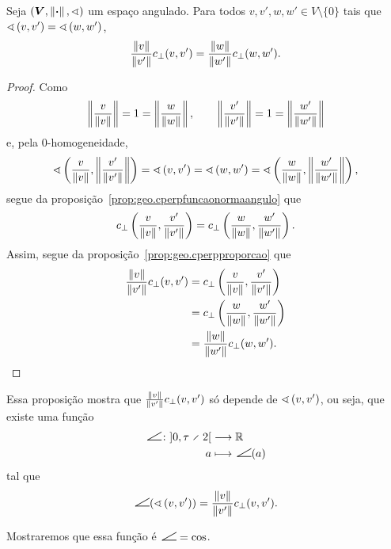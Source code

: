 \begin{proposition}
\label{prop:geo.cperpfuncaoangulo}
Seja $(\bm V, \left\Vert{\bm{\cdot}}\right\Vert,\sphericalangle)$ um espaço angulado. Para todos $v,v',w,w' \in V \setminus \{0\}$ tais que $\sphericalangle\left({v},{v'}\right)=\sphericalangle\left({w},{w'}\right)$,
	\begin{equation*}
	\frac{\left\Vert{v}\right\Vert}{\left\Vert{v'}\right\Vert}c_{\perp}(v,v') = \frac{\left\Vert{w}\right\Vert}{\left\Vert{w'}\right\Vert}c_{\perp}(w,w').
	\end{equation*}
\end{proposition}
\begin{proof}
Como
	\begin{equation*}
	\left\Vert{\frac{v}{\left\Vert{v}\right\Vert}}\right\Vert = 1 = \left\Vert{\frac{w}{\left\Vert{w}\right\Vert}}\right\Vert, \qquad \left\Vert{\frac{v'}{\left\Vert{v'}\right\Vert}}\right\Vert = 1 = \left\Vert{\frac{w'}{\left\Vert{w'}\right\Vert}}\right\Vert
	\end{equation*}
e, pela $0$-homogeneidade,
	\begin{equation*}
	\sphericalangle\left({\frac{v}{\left\Vert{v}\right\Vert}},{\left\Vert{\frac{v'}{\left\Vert{v'}\right\Vert}}\right\Vert}\right) = \sphericalangle\left({v},{v'}\right) = \sphericalangle\left({w},{w'}\right) = \sphericalangle\left({\frac{w}{\left\Vert{w}\right\Vert}},{\left\Vert{\frac{w'}{\left\Vert{w'}\right\Vert}}\right\Vert}\right),
	\end{equation*}
segue da proposição~\ref{prop:geo.cperpfuncaonormaangulo} que
	\begin{equation*}
	c_{\perp}\left( \frac{v}{\left\Vert{v}\right\Vert},\frac{v'}{\left\Vert{v'}\right\Vert} \right) = c_{\perp}\left( \frac{w}{\left\Vert{w}\right\Vert},\frac{w'}{\left\Vert{w'}\right\Vert} \right).
	\end{equation*}
Assim, segue da proposição~\ref{prop:geo.cperpproporcao} que
	\begin{align*}
	\frac{\left\Vert{v}\right\Vert}{\left\Vert{v'}\right\Vert}c_{\perp}(v,v') &= c_{\perp}\left( \frac{v}{\left\Vert{v}\right\Vert},\frac{v'}{\left\Vert{v'}\right\Vert} \right) \\
		&= c_{\perp}\left( \frac{w}{\left\Vert{w}\right\Vert},\frac{w'}{\left\Vert{w'}\right\Vert} \right) \\
		&= \frac{\left\Vert{w}\right\Vert}{\left\Vert{w'}\right\Vert}c_{\perp}(w,w').
	\end{align*}
\end{proof}

Essa proposição mostra que $\frac{\left\Vert{v}\right\Vert}{\left\Vert{v'}\right\Vert}c_{\perp}(v,v')$ só depende de $\sphericalangle\left({v},{v'}\right)$, ou seja, que existe uma função
	\begin{align*}
	\func{\ncos}{\intaa{0}{\tau \div 2}}{\R}{a}{\ncos(a)}
	\end{align*}
tal que
	\begin{equation*}
	\ncos(\ang{v}{v'}) = \frac{\nor{v}}{\nor{v'}}c_{\perp}(v,v').
	\end{equation*}

 Mostraremos que essa função é $\ncos = \cos$.

































